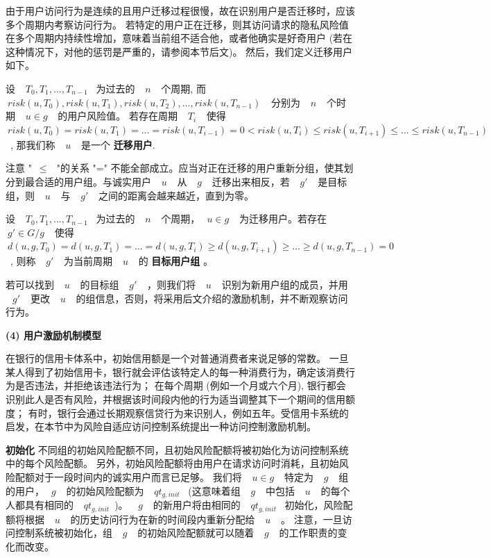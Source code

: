 由于用户访问行为是连续的且用户迁移过程很慢，故在识别用户是否迁移时，应该多个周期内考察访问行为。 若特定的用户正在迁移，则其访问请求的隐私风险值在多个周期内持续性增加，意味着当前组不适合他，或者他确实是好奇用户 (若在这种情况下，对他的惩罚是严重的，请参阅本节后文)。 然后，我们定义迁移用户如下。

\begin{definition}%
	\label{def:migrating user}
	设 ~$~T_0,T_1,...,T_{n-1}$~ 为过去的 ~$~n~$~ 个周期, 而 ~$~risk(u,T_0),risk(u,T_1),risk(u,T_2),..., risk(u,T_{n-1})~$~ 分别为 ~$~n~$~ 个时期 ~$~u\in g~$~ 的用户风险值。 若存在周期 ~$~T_i~$~ 使得 ~$~risk(u,T_0) = risk(u,T_1) = ... = risk(u,T_{i-1}) =0  < risk(u,T_{i}) \leq risk(u,T_{i+1}) \leq ... \leq risk(u,T_{n-1})~$~, 那我们称 ~$~u~$~ 是一个 \textbf{迁移用户}.
\end{definition}

注意 "~$\leq~$~"的关系 "=" 不能全部成立。应当对正在迁移的用户重新分组，使其划分到最合适的用户组。与诚实用户 ~$~u~$~ 从 ~$~g~$~ 迁移出来相反，若 ~$~g'~$~ 是目标组，则 ~$~u~$~ 与 ~$~g'~$~ 之间的距离会越来越近，直到为零。

\begin{definition}%
	\label{def:target group}
	设 ~$~T_0,T_1,...,T_{n-1}$~ 为过去的 ~$~n~$~ 个周期，~$~u \in g~$~ 为迁移用户。若存在 ~$~g' \in G/g~$~ 使得 ~$~d(u,g,T_0) = d(u,g,T_1) = ... = d(u,g,T_i) \geq d(u,g,T_{i+1}) \geq ... \geq d(u,g,T_{n-1}) = 0~$~, 则称 ~$~g'~$~ 为当前周期 ~$~u~$~ 的 \textbf{目标用户组} 。 
\end{definition}

若可以找到 ~$~u~$~ 的目标组 ~$~g'~$~ ，则我们将 ~$~u~$~ 识别为新用户组的成员，并用 ~$~g'~$~ 更改 ~$~u~$~ 的组信息，否则，将采用后文介绍的激励机制，并不断观察访问行为。

\textbf{(4) 用户激励机制模型}


在银行的信用卡体系中，初始信用额是一个对普通消费者来说足够的常数。 一旦某人得到了初始信用卡，银行就会评估该特定人的每一种消费行为，确定该消费行为是否违法，并拒绝该违法行为； 在每个周期 (例如一个月或六个月), 银行都会识别此人是否有风险，并根据该时间段内他的行为适当调整其下一个期间的信用额度； 有时，银行会通过长期观察信贷行为来识别人，例如五年。受信用卡系统的启发，在本节中为风险自适应访问控制系统提出一种访问控制激励机制。

\textbf{初始化} 不同组的初始风险配额不同，且初始风险配额将被初始化为访问控制系统中的每个风险配额。 另外，初始风险配额将由用户在请求访问时消耗，且初始风险配额对于一段时间内的诚实用户而言已足够。 我们将 ~$~u \in g~$~ 特定为 ~$~g~$~ 组的用户，~$~g~$~ 的初始风险配额为 ~$~qt_{g,init}$~ (这意味着组 ~$~g~$~ 中包括 ~$~u~$~ 的每个人都具有相同的 ~$~qt_{g,init}$~)。 ~$~g~$~ 的新用户将由相同的 ~$~qt_{g,init}$~ 初始化，风险配额将根据 ~$~u~$~ 的历史访问行为在新的时间段内重新分配给 ~$~u~$~ 。 注意，一旦访问控制系统被初始化，组 ~$~g~$~ 的初始风险配额就可以随着 ~$~g~$~ 的工作职责的变化而改变。

